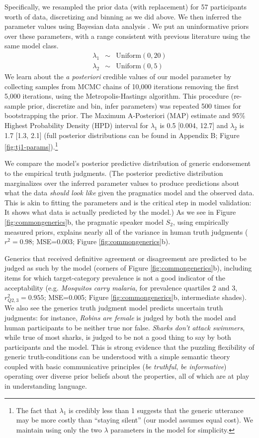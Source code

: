 \documentclass[12pt,letterpaper]{article}
\begin{document}
Specifically, we resampled the prior data (with replacement) for 57 participants worth of data, discretizing and binning as we did above. We then inferred the parameter values using Bayesian data analysis \cite{LW2014}. We put an uninformative priors over these parameters, with a range consistent with previous literature using the same model class.
%
\begin{eqnarray*}
\lambda_1 &\sim& \text{Uniform}(0,20) \\
\lambda_2 &\sim& \text{Uniform}(0,5)
\end{eqnarray*}
%
We learn about the \emph{a posteriori} credible values of our model parameter by collecting samples from MCMC chains of 10,000 iterations removing the first 5,000 iterations, using the Metropolis-Hastings algorithm. 
This procedure (re-sample prior, discretize and bin, infer parameters) was repeated 500 times for bootstrapping the prior.
The Maximum A-Posteriori (MAP) estimate and 95\% Highest Probability Density (HPD) interval for $\lambda_1$ is 0.5 [0.004, 12.7] and $\lambda_2$ is 1.7 [1.3, 2.1] (full posterior distributions can be found in Appendix B; Figure \ref{fig:tj1-params}).\footnote{
The fact that $\lambda_1$ is credibly less than 1 suggests that the generic utterance may be more costly than ``staying silent'' (our model assumes equal cost).
We maintain using only the two $\lambda$ parameters in the model for simplicity.
}

We compare the model's posterior predictive distribution of generic endorsement to the empirical truth judgments.
(The posterior predictive distribution marginalizes over the inferred parameter values to produce predictions about what the data \emph{should look like} given the pragmatics model and the observed data. 
This is akin to fitting the parameters and is the critical step in model validation: It shows what data is actually predicted by the model.) 
As we see in Figure \ref{fig:commongenerics}b, the pragmatic speaker model $S_2$, using empirically measured priors, explains nearly all of the variance in human truth judgments ($r^2=0.98$; MSE=0.003; Figure \ref{fig:commongenerics}b). 

Generics that received definitive agreement or disagreement are predicted to be judged as such by the model (corners of Figure \ref{fig:commongenerics}b), including items for which target-category prevalence is not a good indicator of the acceptability (e.g. \emph{Mosquitos carry malaria}, for prevalence quartiles 2 and 3, $r_{Q2,3}^2=0.955$; MSE=0.005; Figure \ref{fig:commongenerics}b, intermediate shades).
We also see the generics truth judgment model predicts uncertain truth judgments: for instance, \emph{Robins are female} is judged by both the model and human participants to be neither true nor false.
\emph{Sharks don't attack swimmers}, while true of most sharks, is judged to be not a good thing to say by both participants and the model.
This is strong evidence that the puzzling flexibility of generic truth-conditions can be understood with a simple semantic theory coupled with basic communicative principles (\emph{be truthful}, \emph{be informative}) operating over diverse prior beliefs about the properties, all of which are at play in understanding language. 
\end{document}

